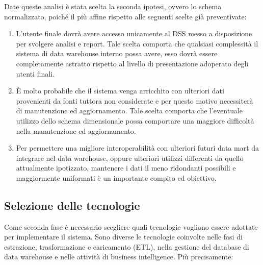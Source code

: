 Date queste analisi è stata scelta la seconda ipotesi, ovvero lo schema normalizzato, poiché il più affine rispetto alle seguenti scelte già preventivate:

\begin{enumerate}
    \item L'utente finale dovrà avere accesso unicamente al DSS messo a disposizione per svolgere analisi e report. Tale scelta comporta che qualsiasi complessità il sistema di data warehouse interno possa avere, esso dovrà essere completamente astratto rispetto al livello di presentazione adoperato degli utenti finali.
    \item È molto probabile che il sistema venga arricchito con ulteriori dati provenienti da fonti tuttora non considerate e per questo motivo necessiterà di manutenzione ed aggiornamento. Tale scelta comporta che l'eventuale utilizzo dello schema dimensionale possa comportare una maggiore difficoltà nella manutenzione ed aggiornamento.
    \item Per permettere una migliore interoperabilità con ulteriori futuri data mart da integrare nel data warehouse, oppure ulteriori utilizzi differenti da quello attualmente ipotizzato, mantenere i dati il meno ridondanti possibili e maggiormente uniformati è un importante compito ed obiettivo.
\end{enumerate}

\subsection{Selezione delle tecnologie}

Come seconda fase è necessario scegliere quali tecnologie vogliono essere adottate per implementare il sistema. Sono diverse le tecnologie coinvolte nelle fasi di estrazione, trasformazione e caricamento (ETL), nella gestione del database di data warehouse e nelle attività di business intelligence. Più precisamente:

